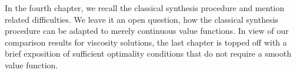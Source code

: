 In the fourth chapter, we recall the classical synthesis procedure and mention related difficulties. We leave it an open question, how the classical synthesis procedure can be adapted to merely continuous value functions. In view of our comparison results for viscosity solutions, the last chapter is topped off with a brief exposition of sufficient optimality conditions that do not require a smooth value function.





